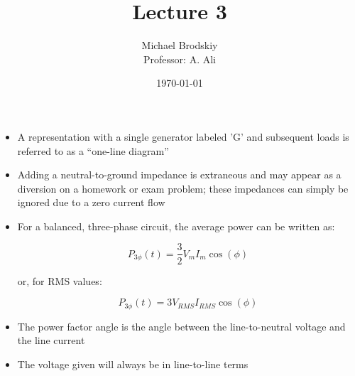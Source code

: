 


\title{Lecture 3}
\date{\today}
\author{Michael Brodskiy\\ \small Professor: A. Ali}



\maketitle

\begin{itemize}

  \item A representation with a single generator labeled 'G' and subsequent loads is referred to as a ``one-line diagram''

  \item Adding a neutral-to-ground impedance is extraneous and may appear as a diversion on a homework or exam problem; these impedances can simply be ignored due to a zero current flow

  \item For a balanced, three-phase circuit, the average power can be written as:

    $$P_{3\phi}(t)=\frac{3}{2}V_mI_m\cos(\phi)$$

    \begin{center}
      or, for RMS values:
    \end{center}

    \vspace{-15pt}

    $$P_{3\phi}(t)=3V_{RMS}I_{RMS}\cos(\phi)$$

  \item The power factor angle is the angle between the line-to-neutral voltage and the line current

  \item The voltage given will always be in line-to-line terms

\end{itemize}



